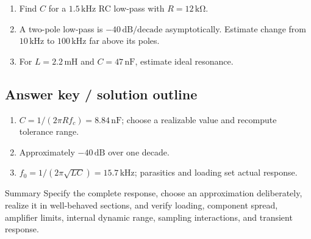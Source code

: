 \documentclass[10pt,letterpaper]{article}
\begin{document}
\begin{enumerate}
  \item Find $C$ for a $1.5\,\mathrm{kHz}$ RC low-pass with $R=12\,\mathrm{k\Omega}$.
  \item A two-pole low-pass is $-40\,\mathrm{dB/decade}$ asymptotically. Estimate change from $10\,\mathrm{kHz}$ to $100\,\mathrm{kHz}$ far above its poles.
  \item For $L=2.2\,\mathrm{mH}$ and $C=47\,\mathrm{nF}$, estimate ideal resonance.
\end{enumerate}\subsection{Answer key / solution outline}
\begin{enumerate}
  \item $C=1/(2\pi Rf_c)=8.84\,\mathrm{nF}$; choose a realizable value and recompute tolerance range.
  \item Approximately $-40\,\mathrm{dB}$ over one decade.
  \item $f_0=1/(2\pi\sqrt{LC})=15.7\,\mathrm{kHz}$; parasitics and loading set actual response.
\end{enumerate}\begin{CornellSummaryBox}{Summary}
Specify the complete response, choose an approximation deliberately, realize it in well-behaved sections, and verify loading, component spread, amplifier limits, internal dynamic range, sampling interactions, and transient response.
\end{CornellSummaryBox}
\end{document}
